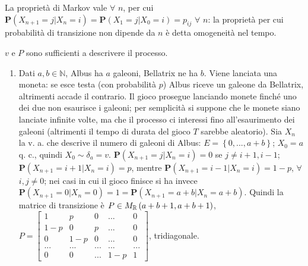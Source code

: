 \documentclass{article}
\begin{document}
La propriet\`{a} di Markov vale $\forall $ $n$, per cui $\mathbf{P}\left(
X_{n+1}=j|X_{n}=i\right) =\mathbf{P}\left( X_{1}=j|X_{0}=i\right) =p_{ij}$ $%
\forall $ $n$: la propriet\`{a} per cui probabilit\`{a} di transizione non
dipende da $n$ \`{e} detta omogeneit\`{a} nel tempo.

$v$ e $P$ sono sufficienti a descrivere il processo.

\begin{enumerate}
\item Dati $a,b\in 
\mathbb{N}
$, Albus ha $a$ galeoni, Bellatrix ne ha $b$. Viene lanciata una moneta: se
esce testa (con probabilit\`{a} $p$) Albus riceve un galeone da Bellatrix,
altrimenti accade il contrario. Il gioco prosegue lanciando monete finch\'{e}
uno dei due non esaurisce i galeoni; per semplicit\`{a} si suppone che le
monete siano lanciate infinite volte, ma che il processo ci interessi fino
all'esaurimento dei galeoni (altrimenti il tempo di durata del gioco $T$
sarebbe aleatorio). Sia $X_{n}$ la v. a. che descrive il numero di galeoni
di Albus: $E=\left\{ 0,...,a+b\right\} $; $X_{0}=a$ q. c., quindi $X_{0}\sim
\delta _{a}=v$. $\mathbf{P}\left( X_{n+1}=j|X_{n}=i\right) =0$ se $j\neq
i+1,i-1$; $\mathbf{P}\left( X_{n+1}=i+1|X_{n}=i\right) =p$, mentre $\mathbf{P%
}\left( X_{n+1}=i-1|X_{n}=i\right) =1-p$, $\forall $ $i,j\neq 0$; nei casi
in cui il gioco finisce si ha invece $\mathbf{P}\left(
X_{n+1}=0|X_{n}=0\right) =1=\mathbf{P}\left( X_{n+1}=a+b|X_{n}=a+b\right) $.
Quindi la matrice di transizione \`{e} $P\in M_{%
\mathbb{R}
}\left( a+b+1,a+b+1\right) $, $P=\left[ 
\begin{array}{ccccc}
1 & p & 0 & ... & 0 \\ 
1-p & 0 & p & ... & 0 \\ 
0 & 1-p & 0 & ... & 0 \\ 
... & ... & ... & ... & ... \\ 
0 & 0 & ... & 1-p & 1%
\end{array}%
\right] $, tridiagonale.


\end{enumerate}
\end{document}
